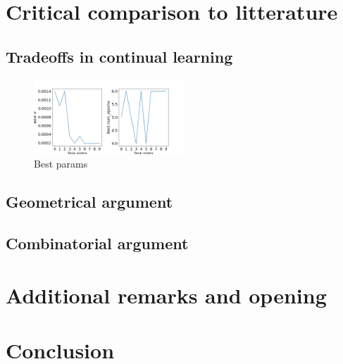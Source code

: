 \documentclass[11pt]{article}
\begin{document}
\section{Critical comparison to litterature}



\subsection{Tradeoffs in continual learning}



\begin{figure}
    \centering
    \includegraphics[width=0.5\textwidth]{images/best_params_greedy_HPO_GroHess_from_output_pMNIST_via_torch_standard_2024-07-16_20-41-35.png}
    \caption{Best params}
    \label{fig:best_params}
\end{figure}


\subsection{Geometrical argument}


\subsection{Combinatorial argument}







\section{Additional remarks and opening}



\section{Conclusion}
\end{document}
